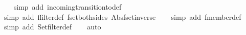 \begin{isabellebody}
%
\isadelimproof
\ \ %
\endisadelimproof
%
\isatagproof
{}\isamarkupfalse%
\ {\isacharparenleft}simp\ add{\isacharcolon}\ incoming{\isacharunderscore}transition{\isacharunderscore}to{\isacharunderscore}def{\isacharparenright}\isanewline
\ \ \isamarkupfalse%
\ {\isacharparenleft}simp\ add{\isacharcolon}\ ffilter{\isacharunderscore}def\ fset{\isacharunderscore}both{\isacharunderscore}sides\ Abs{\isacharunderscore}fset{\isacharunderscore}inverse{\isacharparenright}\isanewline
\ \ \isamarkupfalse%
\ {\isacharparenleft}simp\ add{\isacharcolon}\ fmember{\isacharunderscore}def{\isacharparenright}\isanewline
\ \ \isamarkupfalse%
\ {\isacharparenleft}simp\ add{\isacharcolon}\ Set{\isachardot}filter{\isacharunderscore}def{\isacharparenright}\isanewline
\ \ \isamarkupfalse%
\ auto%
\endisatagproof
{\isafoldproof}%
%
\isadelimproof
\isanewline
%
\endisadelimproof
%
\isadelimtheory
\isanewline
%
\endisadelimtheory
%
\isatagtheory
{}\isamarkupfalse%
%
\endisatagtheory
{\isafoldtheory}%
%
\isadelimtheory
%
\endisadelimtheory
%
\end{isabellebody}%
\endinput
